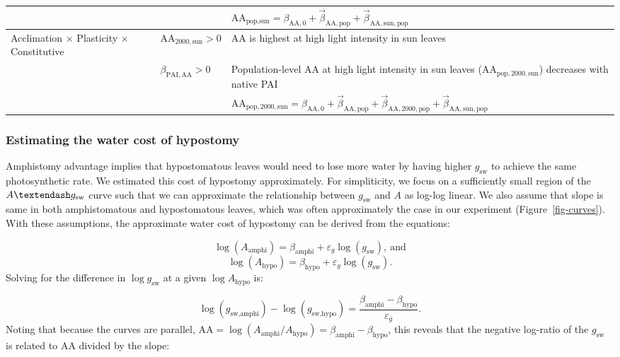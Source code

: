 \documentclass[
  letterpaper,
  DIV=11,
  numbers=noendperiod]{scrartcl}
\newcommand{\aax}{$\mathrm{AA}$}
\newcommand{\agcurve}{$A \textendash g_\text{sw}$}
\newcommand{\gsw}{$g_\text{sw}$}
\begin{document}
\begin{longtable}{>{\raggedright\arraybackslash}p{1in}>{\raggedright\arraybackslash}p{1.5in}>{\raggedright\arraybackslash}p{3in}}
\nopagebreak
 &  & \hspace{-1em}$\mathrm{AA}_{\text{pop},\text{sun}} = \beta_{\mathrm{AA}, 0} + \vec{\beta}_{\mathrm{AA}, \text{pop}} + \vec{\beta}_{\mathrm{AA}, \text{sun}, \text{pop}}$\\
\cmidrule{1-3}\pagebreak[0]
Acclimation $\times$ Plasticity $\times$ Constitutive & $\mathrm{AA}_{2000,\text{sun}} > 0$ & \hspace{-1em}\aax{} is highest at high light intensity in sun leaves\\
\nopagebreak
 & $\beta_{\mathrm{PAI,AA}} > 0$ & \hspace{-1em}Population-level \aax{} at high light intensity in sun leaves ($\mathrm{AA}_{\text{pop},2000,\text{sun}}$) decreases with native PAI\\
\nopagebreak
 &  & \hspace{-1em}$\mathrm{AA}_{\text{pop},2000,\text{sun}} = \beta_{\mathrm{AA}, 0} + \vec{\beta}_{\mathrm{AA}, \text{pop}} + \vec{\beta}_{\mathrm{AA}, 2000, \text{pop}} + \vec{\beta}_{\mathrm{AA}, \text{sun}, \text{pop}}$\\
\bottomrule

\end{longtable}

\subsubsection{Estimating the water cost of
hypostomy}\label{estimating-the-water-cost-of-hypostomy}

Amphistomy advantage implies that hypostomatous leaves would need to
lose more water by having higher \gsw{} to achieve the same
photosynthetic rate. We estimated this cost of hypostomy approximately.
For simpliticity, we focus on a sufficiently small region of the
\agcurve{} curve such that we can approximate the relationship between
\gsw{} and \(A\) as log-log linear. We also assume that slope is same in
both amphistomatous and hypostomatous leaves, which was often
approximately the case in our experiment (Figure~\ref{fig-curves}). With
these assumptions, the approximate water cost of hypostomy can be
derived from the equations:

\[\log(A_{\mathrm{amphi}}) = \beta_\text{amphi} + \varepsilon_g \log(g_\text{sw}),~\text{and}\]
\[\log(A_{\mathrm{hypo}}) = \beta_\text{hypo} + \varepsilon_g \log(g_\text{sw}).\]
Solving for the difference in \(\log{g_\text{sw}}\) at a given
\(\log{A_{\mathrm{hypo}}}\) is:

\[\log(g_\text{sw,amphi}) - \log(g_\text{sw,hypo}) = \frac{\beta_\text{amphi} - \beta_\text{hypo}}{\varepsilon_g}.\]
Noting that because the curves are parallel,
\(\mathrm{AA} = \log(A_\text{amphi} /A_\text{hypo}) = \beta_\text{amphi} - \beta_\text{hypo}\),
this reveals that the negative log-ratio of the \gsw{} is related to
\aax{} divided by the slope:
\end{document}
